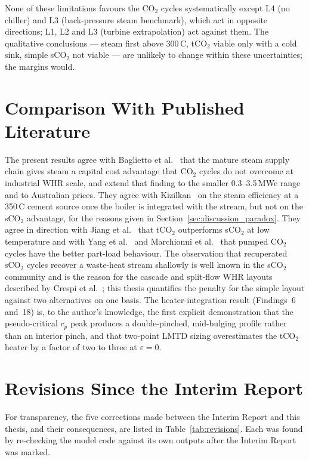 None of these limitations favours the CO$_2$ cycles systematically except
L4 (no chiller) and L3 (back-pressure steam benchmark), which act in opposite
directions; L1, L2 and L3 (turbine extrapolation) act against them. The
qualitative conclusions --- steam first above 300\,\textdegree C, tCO$_2$
viable only with a cold sink, simple sCO$_2$ not viable --- are unlikely to
change within these uncertainties; the margins would.

\section{Comparison With Published Literature}
\label{sec:discussion_comparison}

The present results agree with Baglietto et al.~\cite{Baglietto2023} that the
mature steam supply chain gives steam a capital cost advantage that CO$_2$
cycles do not overcome at industrial WHR scale, and extend that finding to
the smaller 0.3--3.5\,MWe range and to Australian prices. They agree with
Kizilkan~\cite{Kizilkan2020} on the steam efficiency at a 350\,\textdegree C
cement source once the boiler is integrated with the stream, but not on the
sCO$_2$ advantage, for the reasons given in
Section~\ref{sec:discussion_paradox}. They agree in direction with Jiang et
al.~\cite{Jiang2023} that tCO$_2$ outperforms sCO$_2$ at low temperature and
with Yang et al.~\cite{Yang2024} and Marchionni et al.~\cite{Marchionni2020}
that pumped CO$_2$ cycles have the better part-load behaviour. The
observation that recuperated sCO$_2$ cycles recover a waste-heat stream
shallowly is well known in the sCO$_2$ community and is the reason for the
cascade and split-flow WHR layouts described by Crespi et
al.~\cite{Crespi2017}; this thesis quantifies the penalty for the simple
layout against two alternatives on one basis. The heater-integration result
(Findings~6 and~18) is, to the author's knowledge, the first explicit
demonstration that the pseudo-critical $c_p$ peak produces a double-pinched,
mid-bulging profile rather than an interior pinch, and that two-point LMTD
sizing overestimates the tCO$_2$ heater by a factor of two to three at
$\varepsilon = 0$.

\section{Revisions Since the Interim Report}
\label{sec:discussion_revisions}

For transparency, the five corrections made between the Interim Report and
this thesis, and their consequences, are listed in
Table~\ref{tab:revisions}. Each was found by re-checking the model code
against its own outputs after the Interim Report was marked.

